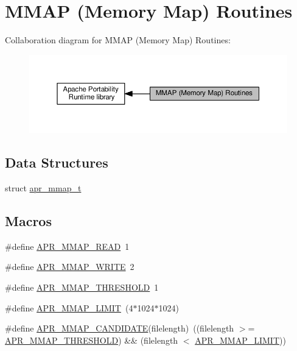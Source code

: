 \hypertarget{group__apr__mmap}{}\section{M\+M\+AP (Memory Map) Routines}
\label{group__apr__mmap}
Collaboration diagram for M\+M\+AP (Memory Map) Routines\+:
\nopagebreak
\begin{figure}[H]
\begin{center}
\leavevmode
\includegraphics[width=350pt]{group__apr__mmap}
\end{center}
\end{figure}
\subsection*{Data Structures}
\begin{DoxyCompactItemize}
\item 
struct \hyperlink{structapr__mmap__t}{apr\+\_\+mmap\+\_\+t}
\end{DoxyCompactItemize}
\subsection*{Macros}
\begin{DoxyCompactItemize}
\item 
\#define \hyperlink{group__apr__mmap_gac231fdf15d2d29802e0abbc5d0cf25b8}{A\+P\+R\+\_\+\+M\+M\+A\+P\+\_\+\+R\+E\+AD}~1
\item 
\#define \hyperlink{group__apr__mmap_gac2eb7f697d8bf190e630b85f967c8273}{A\+P\+R\+\_\+\+M\+M\+A\+P\+\_\+\+W\+R\+I\+TE}~2
\item 
\#define \hyperlink{group__apr__mmap_ga19d1916e7b64bfb1a969648fe7b0846a}{A\+P\+R\+\_\+\+M\+M\+A\+P\+\_\+\+T\+H\+R\+E\+S\+H\+O\+LD}~1
\item 
\#define \hyperlink{group__apr__mmap_ga548e49b3c9e8265ad8ccf70994f4fe25}{A\+P\+R\+\_\+\+M\+M\+A\+P\+\_\+\+L\+I\+M\+IT}~(4$\ast$1024$\ast$1024)
\item 
\#define \hyperlink{group__apr__mmap_ga4f469432098e986567576fd4c4ce5adc}{A\+P\+R\+\_\+\+M\+M\+A\+P\+\_\+\+C\+A\+N\+D\+I\+D\+A\+TE}(filelength)~((filelength $>$= \hyperlink{group__apr__mmap_ga19d1916e7b64bfb1a969648fe7b0846a}{A\+P\+R\+\_\+\+M\+M\+A\+P\+\_\+\+T\+H\+R\+E\+S\+H\+O\+LD}) \&\& (filelength $<$ \hyperlink{group__apr__mmap_ga548e49b3c9e8265ad8ccf70994f4fe25}{A\+P\+R\+\_\+\+M\+M\+A\+P\+\_\+\+L\+I\+M\+IT}))
\end{DoxyCompactItemize}
